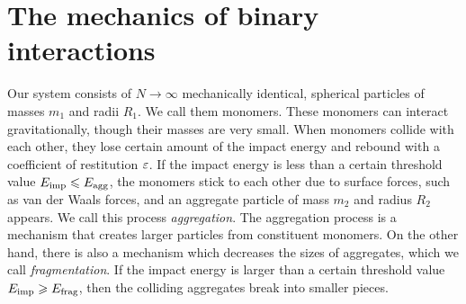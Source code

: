 \documentclass[aps,prl,preprint,groupedaddress,10pt]{revtex4-2}
\begin{document}
\section{The mechanics of binary interactions}
Our system consists of $N\to\infty$ mechanically identical, spherical particles of masses 
$m_1$ and radii $R_1$. We call them monomers. These monomers can interact 
gravitationally, though their masses are very small. When monomers collide with each other,
they lose certain amount of the impact energy and rebound with a coefficient of 
restitution $\varepsilon$. If the impact energy is less than a certain threshold value 
$E_{\mathrm{imp}}\leqslant E_{\mathrm{agg}}$, the monomers stick to each other due to surface 
forces, such as van der Waals forces, and an aggregate particle of mass $m_2$ and radius
$R_2$ appears. We call this process \emph{aggregation}. The aggregation process is a 
mechanism that creates larger particles from constituent monomers. On the other hand, 
there is also a mechanism which decreases the sizes of aggregates, which we call 
\emph{fragmentation}. If the impact energy is larger than a certain threshold value 
$E_{\mathrm{imp}}\geqslant E_{\mathrm{frag}}$, then the colliding aggregates break into smaller 
pieces. 
\end{document}
